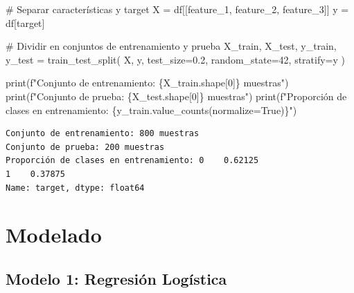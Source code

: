 \documentclass[
]{article}
\newenvironment{Shaded}{\begin{snugshade}}{\end{snugshade}}
\newcommand{\BuiltInTok}[1]{\textcolor[rgb]{0.00,0.23,0.31}{#1}}
\newcommand{\CommentTok}[1]{\textcolor[rgb]{0.37,0.37,0.37}{#1}}
\newcommand{\DecValTok}[1]{\textcolor[rgb]{0.68,0.00,0.00}{#1}}
\newcommand{\FloatTok}[1]{\textcolor[rgb]{0.68,0.00,0.00}{#1}}
\newcommand{\NormalTok}[1]{\textcolor[rgb]{0.00,0.23,0.31}{#1}}
\newcommand{\OperatorTok}[1]{\textcolor[rgb]{0.37,0.37,0.37}{#1}}
\newcommand{\SpecialCharTok}[1]{\textcolor[rgb]{0.37,0.37,0.37}{#1}}
\newcommand{\SpecialStringTok}[1]{\textcolor[rgb]{0.13,0.47,0.30}{#1}}
\newcommand{\StringTok}[1]{\textcolor[rgb]{0.13,0.47,0.30}{#1}}
\newcommand{\VariableTok}[1]{\textcolor[rgb]{0.07,0.07,0.07}{#1}}
\begin{document}
\label{prepare-data}
\begin{Shaded}
\begin{Highlighting}[]
\CommentTok{\# Separar características y target}
\NormalTok{X }\OperatorTok{=}\NormalTok{ df[[}\StringTok{\textquotesingle{}feature\_1\textquotesingle{}}\NormalTok{, }\StringTok{\textquotesingle{}feature\_2\textquotesingle{}}\NormalTok{, }\StringTok{\textquotesingle{}feature\_3\textquotesingle{}}\NormalTok{]]}
\NormalTok{y }\OperatorTok{=}\NormalTok{ df[}\StringTok{\textquotesingle{}target\textquotesingle{}}\NormalTok{]}

\CommentTok{\# Dividir en conjuntos de entrenamiento y prueba}
\NormalTok{X\_train, X\_test, y\_train, y\_test }\OperatorTok{=}\NormalTok{ train\_test\_split(}
\NormalTok{    X, y, test\_size}\OperatorTok{=}\FloatTok{0.2}\NormalTok{, random\_state}\OperatorTok{=}\DecValTok{42}\NormalTok{, stratify}\OperatorTok{=}\NormalTok{y}
\NormalTok{)}

\BuiltInTok{print}\NormalTok{(}\SpecialStringTok{f"Conjunto de entrenamiento: }\SpecialCharTok{\{}\NormalTok{X\_train}\SpecialCharTok{.}\NormalTok{shape[}\DecValTok{0}\NormalTok{]}\SpecialCharTok{\}}\SpecialStringTok{ muestras"}\NormalTok{)}
\BuiltInTok{print}\NormalTok{(}\SpecialStringTok{f"Conjunto de prueba: }\SpecialCharTok{\{}\NormalTok{X\_test}\SpecialCharTok{.}\NormalTok{shape[}\DecValTok{0}\NormalTok{]}\SpecialCharTok{\}}\SpecialStringTok{ muestras"}\NormalTok{)}
\BuiltInTok{print}\NormalTok{(}\SpecialStringTok{f"Proporción de clases en entrenamiento: }\SpecialCharTok{\{}\NormalTok{y\_train}\SpecialCharTok{.}\NormalTok{value\_counts(normalize}\OperatorTok{=}\VariableTok{True}\NormalTok{)}\SpecialCharTok{\}}\SpecialStringTok{"}\NormalTok{)}
\end{Highlighting}
\end{Shaded}

\begin{verbatim}
Conjunto de entrenamiento: 800 muestras
Conjunto de prueba: 200 muestras
Proporción de clases en entrenamiento: 0    0.62125
1    0.37875
Name: target, dtype: float64
\end{verbatim}

\section{Modelado}\label{modelado}

\subsection{Modelo 1: Regresión
Logística}\label{modelo-1-regresiuxf3n-loguxedstica}
\end{document}
